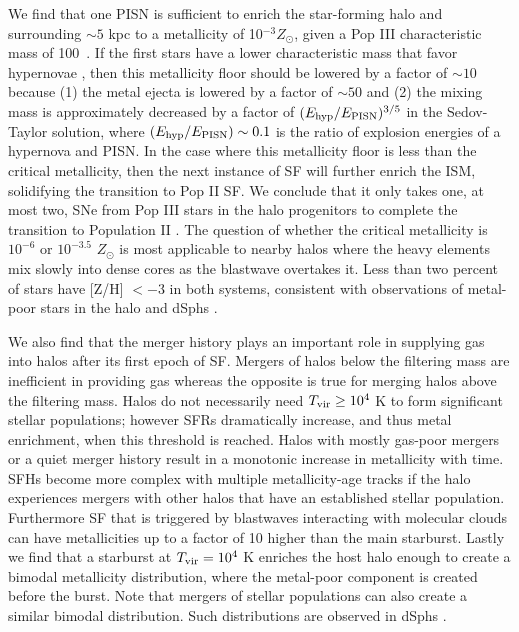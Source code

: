 \documentclass[12pt]{article}
\newcommand{\Ms}{\ifmmode{M_\odot}\else{$M_\odot$}\fi}
\newcommand\tento[1]{$10^{#1}$}
\newcommand{\tvir}{\ifmmode{T_{\rm{vir}}}\else{$T_{\rm{vir}}$}\fi}
\begin{document}
We find that one PISN is sufficient to enrich the star-forming halo
and surrounding $\sim 5$ kpc to a metallicity of 10$^{-3} Z_\odot$,
given a Pop III characteristic mass of 100~\Ms.  If the first stars
have a lower characteristic mass that favor hypernovae
\cite{Tumlinson07_IMF}, then this metallicity floor should be lowered
by a factor of $\sim 10$ because (1) the metal ejecta is lowered by a
factor of $\sim 50$ and (2) the mixing mass is approximately decreased
by a factor of $(E_{\rm hyp}/E_{\rm PISN})^{3/5}$ in the Sedov-Taylor
solution, where $(E_{\rm hyp}/E_{\rm PISN}) \sim 0.1$ is the ratio of
explosion energies of a hypernova and PISN.  In the case where this
metallicity floor is less than the critical metallicity, then the next
instance of SF will further enrich the ISM, solidifying the transition
to Pop II SF.  We conclude that it only takes one, at most two, SNe
from Pop III stars in the halo progenitors to complete the transition
to Population II \cite{Frebel10}.  The question of
whether the critical metallicity is \tento{-6} or \tento{-3.5}
$Z_\odot$ is most applicable to nearby halos where the heavy elements
mix slowly into dense cores as the blastwave overtakes it.  Less than
two percent of stars have [Z/H] $< -3$ in both systems, consistent
with observations of metal-poor stars in the halo and dSphs
\cite{Beers05, Battaglia10}.

We also find that the merger history plays an important role in
supplying gas into halos after its first epoch of SF.  Mergers of
halos below the filtering mass are inefficient in providing gas
whereas the opposite is true for merging halos above the filtering
mass.  Halos do not necessarily need $\tvir \ge 10^4$ K to form
significant stellar populations; however SFRs dramatically increase,
and thus metal enrichment, when this threshold is reached.  Halos with
mostly gas-poor mergers or a quiet merger history result in a
monotonic increase in metallicity with time.  SFHs become more complex
with multiple metallicity-age tracks if the halo experiences mergers
with other halos that have an established stellar population.
Furthermore SF that is triggered by blastwaves interacting with
molecular clouds can have metallicities up to a factor of 10 higher
than the main starburst.  Lastly we find that a starburst at $\tvir =
10^4$ K enriches the host halo enough to create a bimodal metallicity
distribution, where the metal-poor component is created before the
burst.  Note that mergers of stellar populations can also create a
similar bimodal distribution.  Such distributions are observed in
dSphs \cite{Battaglia10}.
\end{document}
